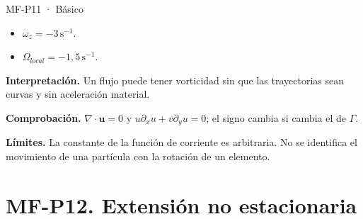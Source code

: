 \begin{studiumworked}{MF-P11 · Básico}
\begin{itemize}
\item $\omega_z=-3\,\mathrm{s^{-1}}$.

\item $\Omega_{local}=-1{,}5\,\mathrm{s^{-1}}$.

\end{itemize}

\textbf{Interpretación.} Un flujo puede tener vorticidad sin que las trayectorias sean curvas y sin aceleración material.

\textbf{Comprobación.} $\nabla\cdot\boldsymbol u=0$ y $u\partial_xu+v\partial_yu=0$; el signo cambia si cambia el de $\Gamma$.

\textbf{Límites.} La constante de la función de corriente es arbitraria. No se identifica el movimiento de una partícula con la rotación de un elemento.

\end{studiumworked}



\Needspace{.30\textheight}\section{MF-P12. Extensión no estacionaria}

